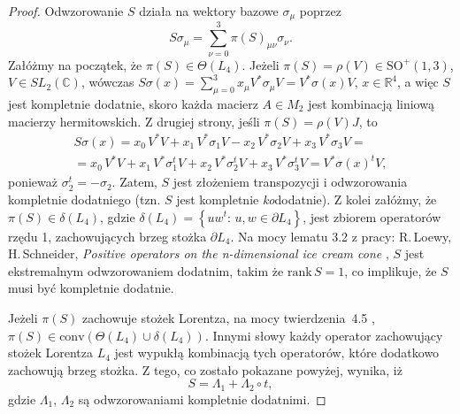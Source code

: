 \begin{proof}
\label{RandomLabel:875919}
  Odwzorowanie $S$ działa na wektory bazowe $\sigma_{\mu}$ poprzez
\begin{equation}
 S \sigma_{\mu} = \sum_{\nu = 0}^{3} \pi(S)_{\mu \nu} \sigma_{\nu}.
\end{equation}
Załóżmy na początek, że $\pi(S) \in \Theta(L_{4})$.
Jeżeli $\pi(S) = \rho(V) \in \text{SO}^{+}(1,3)$,
$V \in SL_{2}(\mathbb{C})$,
wówczas
$S \sigma(x) = \sum_{\mu = 0}^{3}  x_{\mu} V^{*} \sigma_{\mu} V =
 V^{*} \sigma(x) V$,
 $x \in \mathbb{R}^{4}$,
a więc $S$ jest kompletnie dodatnie,
skoro każda macierz $A \in M_{2}$ jest kombinacją liniową macierzy hermitowskich.
Z drugiej strony,
jeśli $\pi(S) = \rho(V) J$,
to
\begin{multline}
\label{RandomLabel:830200}
S \sigma(x) =
  x_{0} \, V^{*}V + x_{1} \, V^{*} \sigma_{1} V -
  x_{2} \, V^{*} \sigma_{2} V +
  x_{3} \, V^{*} \sigma_{3} V = \\
  = x_{0} \, V^{*}V + x_{1} \, V^{*} \sigma_{1}^{t} V +
  x_{2} \, V^{*} \sigma_{2}^{t} V +
  x_{3} \, V^{*} \sigma_{3}^{t} V =
  V^{*} \sigma(x)^{t} V,
\end{multline}
ponieważ $\sigma_{2}^{t} = - \sigma_{2}$.
Zatem, $S$ jest złożeniem transpozycji i odwzorowania kompletnie dodatniego
(tzn. $S$  jest kompletnie \emph{ko}dodatnie).
Z kolei załóżmy, że $\pi(S) \in \delta(L_{4})$,
gdzie
$
 \delta(L_{4}) = \left \{ u w^{t}:
 \, u, w \in \partial L_{4}  \right \}
$,
jest zbiorem operatorów rzędu 1, zachowujących brzeg stożka $\partial L_{4}$.
Na mocy  lematu 3.2 z pracy:
R.\,Loewy, H.\,Schneider,
\emph{Positive operators on the n-dimensional ice cream cone}
\cite{loewy1975positive},
$S$ jest ekstremalnym odwzorowaniem dodatnim, takim że $\text{rank}\,S = 1$,
co implikuje, że $S$ musi być kompletnie dodatnie.

Jeżeli $\pi(S)$ zachowuje stożek Lorentza,
na mocy \mbox{twierdzenia 4.5} \cite{loewy1975positive},
$\pi(S) \in \text{conv} \left ( \Theta(L_{4}) \cup \delta(L_{4}) \right)$.
Innymi słowy każdy operator zachowujący stożek Lorentza $L_{4}$
jest wypukłą kombinacją tych operatorów, które dodatkowo zachowują brzeg stożka.
Z tego, co zostało pokazane powyżej, wynika, iż
\begin{equation}
\label{RandomLabel:587827}
    S = \Lambda_{1} + \Lambda_{2} \circ t,
\end{equation}
gdzie $\Lambda_{1}$, $\Lambda_{2}$
są odwzorowaniami kompletnie dodatnimi.
\end{proof}

